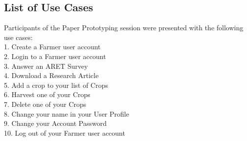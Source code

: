 \documentclass[12pt,letterpaper]{article}
\begin{document}
\subsection{List of Use Cases}
Participants of the Paper Prototyping session were presented with the following use cases:\\
1.\hspace*{8pt} Create a Farmer user account\\
2.\hspace*{8pt} Login to a Farmer user account\\
3.\hspace*{8pt} Answer an ARET Survey\\
4.\hspace*{8pt} Download a Research Article\\
5.\hspace*{8pt} Add a crop to your list of Crops\\
6.\hspace*{8pt} Harvest one of your Crops\\
7.\hspace*{8pt} Delete one of your Crops\\
8.\hspace*{8pt} Change your name in your User Profile\\
9.\hspace*{8pt} Change your Account Password\\
10.\hspace*{3pt} Log out of your Farmer user account
\end{document}
